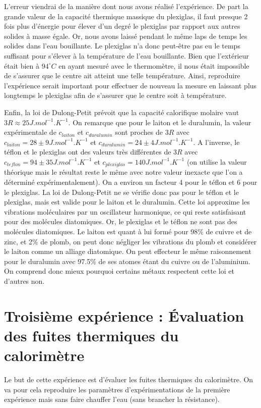 \documentclass[12pt]{article}
\begin{document}
L'erreur viendrai de la manière dont nous avons réalisé l'expérience. De part la grande valeur de la capacité thermique massique du plexiglas, il faut presque 2 fois plus d'énergie pour élever d'un degré le plexiglas
par rapport aux autres solides à masse égale. Or, nous avons laissé pendant le même laps de temps les solides dans l'eau bouillante. Le plexiglas n'a donc peut-être pas eu le temps suffisant pour s'élever à la température de l'eau bouillante.
Bien que l'extérieur était bien à $94^\circ C$ en ayant mesuré avec le thermomètre, il nous était impossible de s'assurer que le centre ait atteint une telle température. Ainsi, reproduire l'expérience serait important pour effectuer de nouveau la mesure
en laissant plus longtemps le plexiglas afin de s'assurer que le centre soit à température.


Enfin, la loi de Dulong-Petit prévoit que la capacité calorifique molaire vaut $3R \approx 25 J.mol^{-1}.K^{-1}$. On remarque que pour le laiton et le duralumin, 
la valeur expérimentale de $c_{laiton}$ et $c_{duralumin}$ sont proches de $3R$ avec $c_{laiton} = 28 \pm 9 J.mol^{-1}.K^{-1}$ et $c_{duralumin} = 24 \pm 4 J.mol^{-1}.K^{-1}$. 
A l'inverse, le téflon et le plexiglas ont des valeurs très différentes de $3R$ avec $c_{teflon} = 94 \pm 35 J.mol^{-1}.K^{-1}$ et $c_{plexiglas} = 140 J.mol^{-1}.K^{-1}$ 
(on utilise la valeur théorique mais le résultat reste le même avec notre valeur inexacte que l'on a déterminé expérimentalement). On a environ un facteur 4 pour le téflon et 6 pour le plexiglas. La loi de Dulong-Petit ne se vérifie donc pas pour le téflon et le plexiglas, mais est valide pour le laiton et le duralumin.
Cette loi approxime les vibrations moléculaires par un oscillateur harmonique, ce qui reste satisfaisant pour des molécules diatomiques. Or, le plexiglas et le téflon ne sont pas des molécules diatomiques. 
Le laiton est quant à lui formé pour 98\% de cuivre et de zinc, et 2\% de plomb, on peut donc négliger les vibrations du plomb et considérer le laiton comme un alliage diatomique. On peut effecteur le même raisonnement pour le duralumin avec 97.5\% de ses atomes
étant du cuivre ou de l'aluminium. On comprend donc mieux pourquoi certains métaux respectent cette loi et d'autres non.


\newpage
\section{Troisième expérience : Évaluation des fuites thermiques du calorimètre}
Le but de cette expérience est d'évaluer les fuites thermiques du calorimètre. On va pour cela reproduire les paramètres d'expérimentations de la première expérience mais sans faire chauffer l'eau (sans brancher la résistance).
\end{document}
